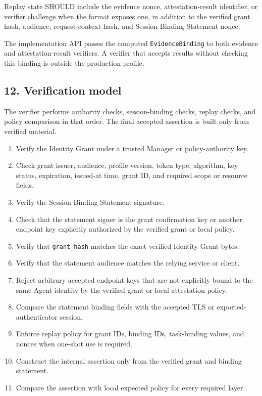 \documentclass[
]{article}
\providecommand{\tightlist}{%
  \setlength{\itemsep}{0pt}\setlength{\parskip}{0pt}}
\begin{document}
Replay state SHOULD include the evidence nonce, attestation-result
identifier, or verifier challenge when the format exposes one, in
addition to the verified grant hash, audience, request-context hash, and
Session Binding Statement nonce.

The implementation API passes the computed \texttt{EvidenceBinding} to
both evidence and attestation-result verifiers. A verifier that accepts
results without checking this binding is outside the production profile.

\subsection{12. Verification model}\label{verification-model}

The verifier performs authority checks, session-binding checks, replay
checks, and policy comparison in that order. The final accepted
assertion is built only from verified material.

\begin{enumerate}
\def\labelenumi{\arabic{enumi}.}
\tightlist
\item
  Verify the Identity Grant under a trusted Manager or policy-authority
  key.
\item
  Check grant issuer, audience, profile version, token type, algorithm,
  key status, expiration, issued-at time, grant ID, and required scope
  or resource fields.
\item
  Verify the Session Binding Statement signature.
\item
  Check that the statement signer is the grant confirmation key or
  another endpoint key explicitly authorized by the verified grant or
  local policy.
\item
  Verify that \texttt{grant\_hash} matches the exact verified Identity
  Grant bytes.
\item
  Verify that the statement audience matches the relying service or
  client.
\item
  Reject arbitrary accepted endpoint keys that are not explicitly bound
  to the same Agent identity by the verified grant or local attestation
  policy.
\item
  Compare the statement binding fields with the accepted TLS or
  exported-authenticator session.
\item
  Enforce replay policy for grant IDs, binding IDs, task-binding values,
  and nonces when one-shot use is required.
\item
  Construct the internal assertion only from the verified grant and
  binding statement.
\item
  Compare the assertion with local expected policy for every required
  layer.
\end{enumerate}
\end{document}
